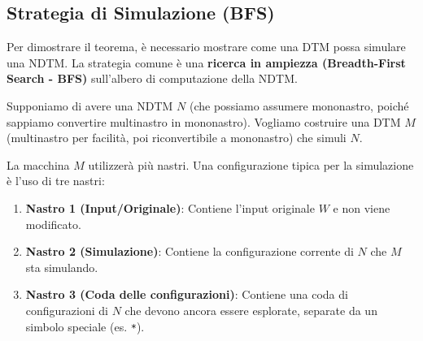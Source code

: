 \documentclass[a4paper]{article}
\begin{document}
\subsection{Strategia di Simulazione (BFS)}
Per dimostrare il teorema, è necessario mostrare come una DTM possa simulare una NDTM. La strategia comune è una \textbf{ricerca in ampiezza (Breadth-First Search - BFS)} sull'albero di computazione della NDTM.

Supponiamo di avere una NDTM $N$ (che possiamo assumere mononastro, poiché sappiamo convertire multinastro in mononastro). Vogliamo costruire una DTM $M$ (multinastro per facilità, poi riconvertibile a mononastro) che simuli $N$.


La macchina $M$ utilizzerà più nastri. Una configurazione tipica per la simulazione è l'uso di tre nastri:
\begin{enumerate}
    \item \textbf{Nastro 1 (Input/Originale)}: Contiene l'input originale $W$ e non viene modificato.
    \item \textbf{Nastro 2 (Simulazione)}: Contiene la configurazione corrente di $N$ che $M$ sta simulando.
    \item \textbf{Nastro 3 (Coda delle configurazioni)}: Contiene una coda di configurazioni di $N$ che devono ancora essere esplorate, separate da un simbolo speciale (es. \texttt{*}).
\end{enumerate}
\end{document}
